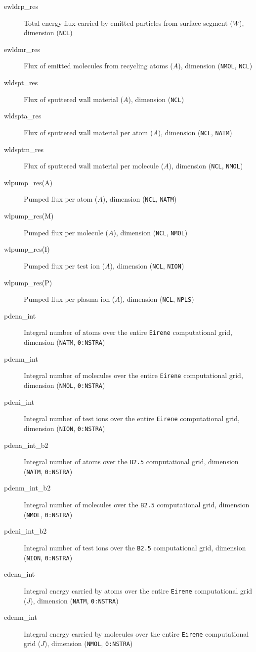 \documentclass[a4paper,10pt]{report}
\begin{document}
\begin{description}
  \item[ewldrp\_res] Total energy flux carried by emitted particles from surface segment ($W$), dimension ({\tt NCL})
  \item[ewldmr\_res] Flux of emitted molecules from recycling atoms ($A$), dimension ({\tt NMOL}, {\tt NCL})
  \item[wldspt\_res] Flux of sputtered wall material ($A$), dimension ({\tt NCL})
  \item[wldspta\_res] Flux of sputtered wall material per atom ($A$), dimension ({\tt NCL}, {\tt NATM})
  \item[wldsptm\_res] Flux of sputtered wall material per molecule ($A$), dimension ({\tt NCL}, {\tt NMOL})
  \item[wlpump\_res(A)] Pumped flux per atom ($A$), dimension ({\tt NCL}, {\tt NATM})
  \item[wlpump\_res(M)] Pumped flux per molecule ($A$), dimension ({\tt NCL}, {\tt NMOL})
  \item[wlpump\_res(I)] Pumped flux per test ion ($A$), dimension ({\tt NCL}, {\tt NION})
  \item[wlpump\_res(P)] Pumped flux per plasma ion ($A$), dimension ({\tt NCL}, {\tt NPLS})
  \item[pdena\_int] Integral number of atoms over the entire {\tt Eirene} computational grid, dimension ({\tt NATM}, {\tt 0:NSTRA})
  \item[pdenm\_int] Integral number of molecules over the entire {\tt Eirene} computational grid, dimension ({\tt NMOL}, {\tt 0:NSTRA})
  \item[pdeni\_int] Integral number of test ions over the entire {\tt Eirene} computational grid, dimension ({\tt NION}, {\tt 0:NSTRA})
  \item[pdena\_int\_b2] Integral number of atoms over the {\tt B2.5} computational grid, dimension ({\tt NATM}, {\tt 0:NSTRA})
  \item[pdenm\_int\_b2] Integral number of molecules over the {\tt B2.5} computational grid, dimension ({\tt NMOL}, {\tt 0:NSTRA})
  \item[pdeni\_int\_b2] Integral number of test ions over the {\tt B2.5} computational grid, dimension ({\tt NION}, {\tt 0:NSTRA})
  \item[edena\_int] Integral energy carried by atoms over the entire {\tt Eirene} computational grid ($J$), dimension ({\tt NATM}, {\tt 0:NSTRA})
  \item[edenm\_int] Integral energy carried by molecules over the entire {\tt Eirene} computational grid ($J$), dimension ({\tt NMOL}, {\tt 0:NSTRA})

\end{description}
\end{document}
